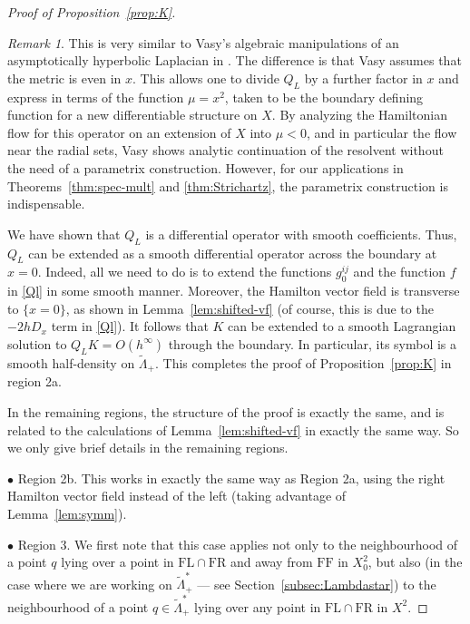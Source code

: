 \documentclass[10pt, a4paper, twoside]{amsart}
\numberwithin{equation}{section}
\theoremstyle{remark}
\newtheorem{remark}[theorem]{Remark}
\begin{document}
\begin{proof}[Proof of Proposition~\ref{prop:K}]
\begin{remark} This is very similar to Vasy's algebraic manipulations of an asymptotically hyperbolic Laplacian in \cite{Vasy}. The difference is that Vasy assumes that the metric is even in $x$. This allows one to divide $Q_L$ by a further factor in $x$ and express in terms of the function $\mu = x^2$, taken to be the boundary defining function for a new differentiable structure on $X$. By analyzing the Hamiltonian flow for this operator on an extension of $X$ into $\mu < 0$, and in particular the flow near the radial sets, Vasy shows analytic continuation of the resolvent without the need of a parametrix construction. However, for our applications in Theorems~\ref{thm:spec-mult} and \ref{thm:Strichartz}, the parametrix construction is indispensable. 
\end{remark}

We have shown that $Q_L$ is a differential operator with smooth coefficients. Thus,  $Q_L$ can be extended as a smooth differential operator across the boundary at $x=0$. Indeed,  all we need to do is to extend the functions $g_0^{ij}$ and the function $f$ in \eqref{Ql} in some smooth manner. 
Moreover, the Hamilton vector field is transverse to $\{ x = 0\}$, as shown in Lemma~\ref{lem:shifted-vf} (of course, this is due to the $-2h D_x$ term in \eqref{Ql}). It follows that $K$ can be extended to a smooth Lagrangian solution to $Q_L K = O(h^\infty)$ through the boundary. In particular, its symbol is a smooth half-density on ${\tilde \Lambda}_+$. This completes the proof of Proposition~\ref{prop:K} in region 2a. 

In the remaining regions, the structure of the proof is exactly the same, and is related to the calculations of Lemma~\ref{lem:shifted-vf} in exactly the same way.  So we only give brief details in the remaining regions. 

$\bullet$ Region 2b. This works in exactly the same way as Region 2a, using the right Hamilton vector field instead of the left (taking advantage of Lemma~\ref{lem:symm}). 

$\bullet$ Region 3. We first note that this case applies not only to the neighbourhood of a point $q$ lying over a point in ${\mathrm{FL}} \cap {\mathrm{FR}}$ and away from ${\mathrm{FF}}$ in $X^2_0$, but also (in the case where we are working on ${\tilde \Lambda}_+^*$ --- see Section~\ref{subsec:Lambdastar}) to the neighbourhood of a point $q \in {\tilde \Lambda}_+^*$ lying over any point in ${\mathrm{FL}} \cap {\mathrm{FR}}$  in $X^2$. 


\end{proof}
\end{document}
